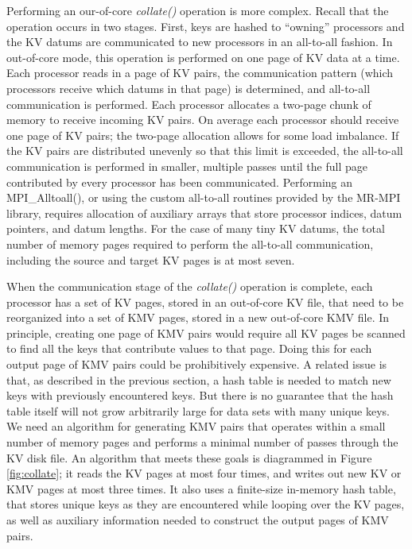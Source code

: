 Performing an our-of-core {\it collate()} operation is more complex.
Recall that the operation occurs in two stages.  First, keys are
hashed to ``owning'' processors and the KV datums are communicated to
new processors in an all-to-all fashion.  In out-of-core mode, this 
operation is
performed on one page of KV data at a time.  Each processor reads in a page of
KV pairs, the communication pattern (which processors receive 
which datums in that page) is
determined, and all-to-all communication is
performed.  Each processor allocates a two-page chunk of memory to
receive incoming KV pairs.  On average each processor should receive
one page of KV pairs; the two-page allocation allows for some
load imbalance.  If the KV pairs are distributed unevenly so that this
limit is exceeded, the all-to-all communication is performed in
smaller, multiple passes until the full page contributed by every
processor has been communicated.  Performing an MPI\_Alltoall(), or
using the custom all-to-all routines provided by the MR-MPI library,
requires allocation of auxiliary arrays that store processor indices,
datum pointers, and datum lengths.  For the case of many tiny KV
datums, the total number of memory pages required to perform the
all-to-all communication, including the source and target KV pages is
at most seven.

When the communication stage of the {\it collate()} operation is
complete, each processor has a set of KV pages, stored in an
out-of-core KV file, that need to be reorganized into a set of KMV
pages, stored in a new out-of-core KMV file.  In principle, 
creating one page of KMV pairs would require all KV pages be scanned
to find all the keys that contribute values to that page.  Doing this
for each output page of KMV pairs could be prohibitively expensive.  A
related issue is that, as described in the previous section, a hash
table is needed to match new keys with previously encountered keys.
But there is no guarantee that the hash table itself will not grow
arbitrarily large for data sets with many unique keys.  We need an
algorithm for generating KMV pairs that operates within a small
number of memory pages and performs a minimal number of passes through
the KV disk file.  An algorithm that meets these goals is diagrammed
in Figure \ref{fig:collate}; it reads the KV pages at most four times, and
writes out new KV or KMV pages at most three times.  It also uses a
finite-size in-memory hash table, that stores unique keys as they are
encountered while looping over the KV pages, as well as auxiliary
information needed to construct the output pages of KMV pairs.

